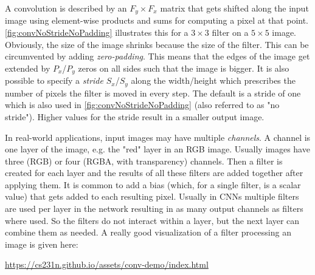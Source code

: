 	A convolution is described by an \( F_y \times F_x \) matrix that gets shifted along the input image using element-wise products and sums for computing a pixel at that point. \autoref{fig:convNoStrideNoPadding} illustrates this for a \(3 \times 3\) filter on a \(5 \times 5\) image. Obviously, the size of the image shrinks because the size of the filter. This can be circumvented by adding \emph{zero-padding}. This means that the edges of the image get extended by \( P_x \)/\( P_y \) zeros on all sides such that the image is bigger. It is also possible to specify a \emph{stride} \(S_x\)/\(S_y\) along the width/height which prescribes the number of pixels the filter is moved in every step. The default is a stride of one which is also used in \autoref{fig:convNoStrideNoPadding} (also referred to as "no stride"). Higher values for the stride result in a smaller output image.

	In real-world applications, input images may have multiple \emph{channels}. A channel is one layer of the image, e.g. the "red" layer in an RGB image. Usually images have three (RGB) or four (RGBA, with transparency) channels. Then a filter is created for each layer and the results of all these filters are added together after applying them. It is common to add a bias (which, for a single filter, is a scalar value) that gets added to each resulting pixel. Usually in CNNs multiple filters are used per layer in the network resulting in as many output channels as filters where used. So the filters do not interact within a layer, but the next layer can combine them as needed. A really good visualization of a filter processing an image is given here:
	\begin{center}
		\url{https://cs231n.github.io/assets/conv-demo/index.html}
	\end{center}

